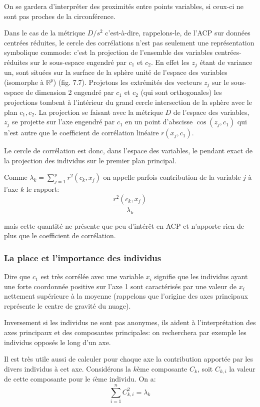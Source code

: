 \documentclass[12pt,a4paper]{article}
\begin{document}
On se gardera d'interpréter des proximités entre points variables, si ceux-ci ne sont pas
proches de la circonférence.

Dans le cas de la métrique $D/s^2$ c'est-à-dire, rappelons-le, de l'ACP sur données centrées
réduites, le cercle des corrélations n'est pas seulement une représentation symbolique commode: c'est la projection de l'ensemble des variables centrées-réduites sur le sous-espace
engendré par $c_1$ et $c_2$. En effet les $z_j$ étant de variance un, sont situées sur la surface de la
sphère unité de l'espace des variables (isomorphe à $\mathbb{R}^p$) (fig. 7.7). Projetons les extrémités
des vecteurs $z_j$ sur le sous-espace de dimension 2 engendré par $c_1$ et $c_2$ (qui sont orthogonales) les projections tombent à l'intérieur du grand cercle intersection de la sphère avec le plan
$c_1, c_2$. La projection se faisant avec la métrique $D$ de l'espace des variables, $z_j$ se projette sur
l'axe engendré par $c_1$ en un point d'abscisse $\cos(z_j, c_1)$ qui n'est autre que le coefficient de
corrélation linéaire $r(x_j, c_1)$.

Le cercle de corrélation est donc, dans l'espace des variables, le pendant exact de la
projection des individus sur le premier plan principal.

Comme $\lambda_k = \sum_{j=1}^p r^2(c_k, x_j)$ on appelle parfois contribution de la variable $j$ à l'axe $k$ le
rapport:
\[\frac{r^2(c_k, x_j)}{\lambda_k}\]

mais cette quantité ne présente que peu d'intérêt en ACP et n'apporte rien de plus que le
coefficient de corrélation.

\subsubsection{La place et l'importance des individus}

Dire que $c_1$ est très corrélée avec une variable $x_i$ signifie que les individus ayant une forte
coordonnée positive sur l'axe 1 sont caractérisés par une valeur de $x_i$ nettement supérieure à la
moyenne (rappelons que l'origine des axes principaux représente le centre de gravité du nuage).

Inversement si les individus ne sont pas anonymes, ils aident à l'interprétation des axes
principaux et des composantes principales: on recherchera par exemple les individus opposés le long d'un axe.

Il est très utile aussi de calculer pour chaque axe la contribution apportée par les divers
individus à cet axe. Considérons la $k$ème composante $C_k$, soit $C_{k,i}$ la valeur de cette composante
pour le $i$ème individu. On a:
\[\sum_{i=1}^n C_{k,i}^2 = \lambda_k\]
\end{document}
